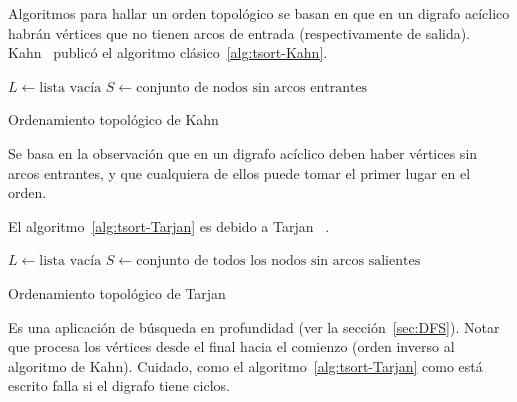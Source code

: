   Algoritmos para hallar un orden topológico
  se basan en que en un digrafo acíclico
  habrán vértices que no tienen arcos de entrada
  (respectivamente de salida).
  Kahn~\cite{kahn62:_topol_sorting_large_net}
  publicó el algoritmo clásico~\ref{alg:tsort-Kahn}.%
  \begin{algorithm}[htbp]
    \DontPrintSemicolon

    \(L \leftarrow \text{lista vacía}\) \;
    \(S \leftarrow \text{conjunto de nodos sin arcos entrantes}\) \;
    \caption{Ordenamiento topológico de Kahn}
    \label{alg:tsort-Kahn}
  \end{algorithm}
  Se basa en la observación que en un digrafo acíclico
  deben haber vértices sin arcos entrantes,
  y que cualquiera de ellos puede tomar el primer lugar en el orden.

  El algoritmo~\ref{alg:tsort-Tarjan} es debido a Tarjan~%
    \cite{tarjan76:_edge_disjoin_spann_trees_depth_first_searc}.%
  \begin{algorithm}[htbp]
    \DontPrintSemicolon

    \(L \leftarrow \text{lista vacía}\) \;
    \(S \leftarrow \text{conjunto de todos los nodos sin arcos salientes}\) \;
    \BlankLine
    \KwProcedure {} \;
    \BlankLine
     \;
    \caption{Ordenamiento topológico de Tarjan}
    \label{alg:tsort-Tarjan}
  \end{algorithm}
  Es una aplicación de búsqueda en profundidad
  (ver la sección~\ref{sec:DFS}).%
  Notar que procesa los vértices desde el final hacia el comienzo
  (orden inverso al algoritmo de Kahn).
  Cuidado,
  como el algoritmo~\ref{alg:tsort-Tarjan}
  como está escrito falla si el digrafo tiene ciclos.


